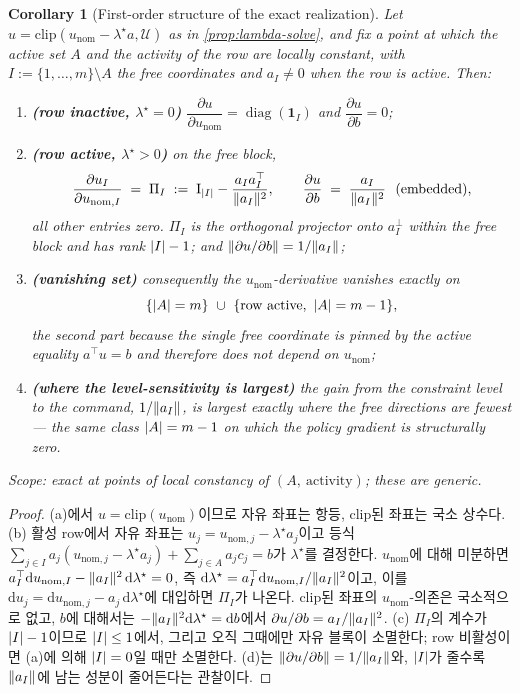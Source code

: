 \documentclass[11pt]{article}
\theoremstyle{plain}
\newtheorem{corollary}[theorem]{Corollary}
\theoremstyle{definition}
\theoremstyle{remark}
\DeclarePairedDelimiter{\norm}{\lVert}{\rVert}
\DeclarePairedDelimiter{\abs}{\lvert}{\rvert}
\newcommand{\calU}{\mathcal{U}}
\newcommand{\eqdef}{:=}
\begin{document}
\begin{corollary}[First-order structure of the exact realization]\label{cor:lambda-jac}
Let $u=\mathrm{clip}(u_{\mathrm{nom}}-\lambda^\star a,\calU)$ as in \cref{prop:lambda-solve},
and fix a point at which the active set $A$ and the activity of the row are locally constant,
with $I\eqdef\{1,\dots,m\}\setminus A$ the free coordinates and $a_I\neq0$ when the row is
active. Then:
\begin{enumerate}[label=(\alph*)]
  \item \textbf{(row inactive, $\lambda^\star=0$)}
  $\dfrac{\partial u}{\partial u_{\mathrm{nom}}}=\operatorname{diag}(\mathbf 1_I)$ and
  $\dfrac{\partial u}{\partial b}=0$;
  \item \textbf{(row active, $\lambda^\star>0$)} on the free block,
  \[
    \frac{\partial u_I}{\partial u_{\mathrm{nom},I}}
      \;=\;\Pi_I\;\eqdef\;\mathrm I_{\abs I}-\frac{a_I a_I^\top}{\norm{a_I}^2},
    \qquad
    \frac{\partial u}{\partial b}\;=\;\frac{a_I}{\norm{a_I}^2}\ \ \text{(embedded)},
  \]
  all other entries zero. $\Pi_I$ is the orthogonal projector onto $a_I^\perp$ within the free
  block and has rank $\abs I-1$; and $\norm{\partial u/\partial b}=1/\norm{a_I}$;
  \item \textbf{(vanishing set)} consequently the $u_{\mathrm{nom}}$-derivative vanishes exactly
  on
  \[
    \{\abs A=m\}\ \cup\ \{\text{row active},\ \abs A=m-1\},
  \]
  the second part because the single free coordinate is pinned by the active equality
  $a^\top u=b$ and therefore does not depend on $u_{\mathrm{nom}}$;
  \item \textbf{(where the level-sensitivity is largest)} the gain from the constraint level to
  the command, $1/\norm{a_I}$, is largest exactly where the free directions are fewest --- the
  same class $\abs A=m-1$ on which the policy gradient is structurally zero.
\end{enumerate}
Scope: exact at points of local constancy of $(A,\ \text{activity})$; these are generic.
\end{corollary}
\begin{proof}
(a)에서 $u=\mathrm{clip}(u_{\mathrm{nom}})$이므로 자유 좌표는 항등, clip된 좌표는 국소 상수다.
(b) 활성 row에서 자유 좌표는 $u_j=u_{\mathrm{nom},j}-\lambda^\star a_j$이고 등식
$\sum_{j\in I}a_j(u_{\mathrm{nom},j}-\lambda^\star a_j)+\sum_{j\in A}a_jc_j=b$가
$\lambda^\star$를 결정한다. $u_{\mathrm{nom}}$에 대해 미분하면
$a_I^\top\mathrm du_{\mathrm{nom},I}-\norm{a_I}^2\,\mathrm d\lambda^\star=0$, 즉
$\mathrm d\lambda^\star=a_I^\top\mathrm du_{\mathrm{nom},I}/\norm{a_I}^2$이고, 이를
$\mathrm du_j=\mathrm du_{\mathrm{nom},j}-a_j\,\mathrm d\lambda^\star$에 대입하면 $\Pi_I$가
나온다. clip된 좌표의 $u_{\mathrm{nom}}$-의존은 국소적으로 없고, $b$에 대해서는
$-\norm{a_I}^2\mathrm d\lambda^\star=\mathrm db$에서 $\partial u/\partial b=a_I/\norm{a_I}^2$.
(c) $\Pi_I$의 계수가 $\abs I-1$이므로 $\abs I\le1$에서, 그리고 오직 그때에만 자유 블록이
소멸한다; row 비활성이면 (a)에 의해 $\abs I=0$일 때만 소멸한다. (d)는
$\norm{\partial u/\partial b}=1/\norm{a_I}$와, $\abs I$가 줄수록 $\norm{a_I}$에 남는 성분이
줄어든다는 관찰이다.
\end{proof}
\end{document}

